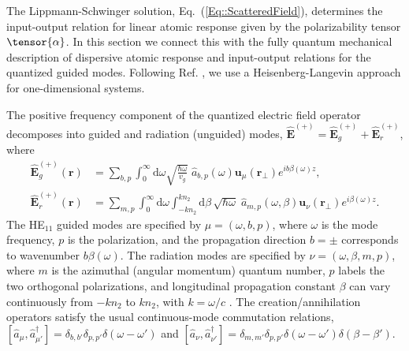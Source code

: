 \documentclass[preprint, aps,pra,onecolumn]{revtex4-1} %
\def\br{\mathbf{r}}
\newcommand{\erf}[1]{Eq.~(\ref{#1})}
\newcommand{\awg}{\hat{a}_{b,p}(\omega)}
\newcommand{\awr}{\hat{a}_{m,p}(\omega,\beta)}
\begin{document}
The Lippmann-Schwinger solution, \erf{Eq::ScatteredField}, determines the input-output relation for linear atomic response given by the polarizability tensor $\tensor{\alpha}$.  
In this section we connect this with the fully quantum mechanical description of dispersive atomic response and input-output relations for the quantized guided modes.  
Following Ref. \cite{le_kien_spontaneous_2005}, we use a Heisenberg-Langevin approach for one-dimensional systems.  

The positive frequency component of the quantized electric field operator decomposes into guided and radiation (unguided) modes, $\hat{\mathbf{E}}^{(+)}=\hat{\mathbf{E}}_g^{(+)}+\hat{\mathbf{E}}_{r}^{(+)}$, where
\begin{subequations}
	\begin{align}
		\hat{\mathbf{E}}_g^{(+)}(\br) &= \sum_{b,p} \int_0^{\infty}\!\!\!\!\!  \mathrm{d}\omega \sqrt{\frac{ \hbar \omega}{ v_g}} \; \awg \mathbf{u}_\mu (\br\!_\perp) e^{i b\beta(\omega) z } ,\label{Eq::QuantizedElectricField} \\
		\hat{\mathbf{E}}_r^{(+)}(\br) &= \sum_{m,p}\int_0^{\infty}\!\!\!\!\! \mathrm{d}\omega   \int_{-kn_2}^{kn_2}\mathrm{d}\beta \, \sqrt{ \hbar \omega}\;\awr \mathbf{u}_\nu (\br\!_\perp) e^{i\beta(\omega) z }.
	\end{align}
\end{subequations}
The HE$_{11}$ guided modes are specified by $\mu =(\omega, b, p)$, where $\omega$ is the mode frequency,  $p$ is the polarization, and the propagation direction $b=\pm$ corresponds to wavenumber $b \beta (\omega)$.  The radiation modes are specified by  $\nu=(\omega, \beta, m, p)$, where $m$ is the azimuthal (angular momentum) quantum number, $p$ labels the two orthogonal polarizations, and longitudinal propagation constant $\beta$ can vary continuously from $-kn_2$ to $kn_2$, with $k = \omega/c$ \cite{sondergaard_general_2001,le_kien_spontaneous_2005}.  
The creation/annihilation operators satisfy the usual continuous-mode commutation relations, $[\hat{a}_\mu, \hat{a}^\dag_{\mu'} ] = \delta_{b,b'} \delta_{p,p'} \delta ( \omega - \omega ') $ and $[\hat{a}_\nu ,\hat{a}^\dag_{\nu'} ] = \delta_{m,m'} \delta_{p,p'} \delta ( \omega - \omega ')  \delta ( \beta - \beta') $.
\end{document}
